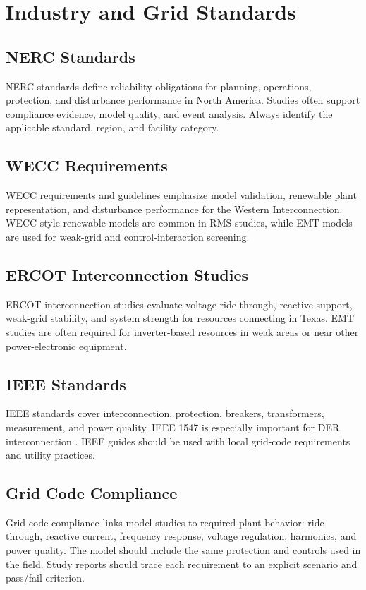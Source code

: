 \documentclass[11pt]{article}
\begin{document}
\section{Industry and Grid Standards}
\subsection{NERC Standards}
NERC standards define reliability obligations for planning, operations, protection, and disturbance performance in North America. Studies often support compliance evidence, model quality, and event analysis. Always identify the applicable standard, region, and facility category.

\subsection{WECC Requirements}
WECC requirements and guidelines emphasize model validation, renewable plant representation, and disturbance performance for the Western Interconnection. WECC-style renewable models are common in RMS studies, while EMT models are used for weak-grid and control-interaction screening.

\subsection{ERCOT Interconnection Studies}
ERCOT interconnection studies evaluate voltage ride-through, reactive support, weak-grid stability, and system strength for resources connecting in Texas. EMT studies are often required for inverter-based resources in weak areas or near other power-electronic equipment.

\subsection{IEEE Standards}
IEEE standards cover interconnection, protection, breakers, transformers, measurement, and power quality. IEEE 1547 is especially important for DER interconnection \cite{ieee1547}. IEEE guides should be used with local grid-code requirements and utility practices.

\subsection{Grid Code Compliance}
Grid-code compliance links model studies to required plant behavior: ride-through, reactive current, frequency response, voltage regulation, harmonics, and power quality. The model should include the same protection and controls used in the field. Study reports should trace each requirement to an explicit scenario and pass/fail criterion.
\end{document}
